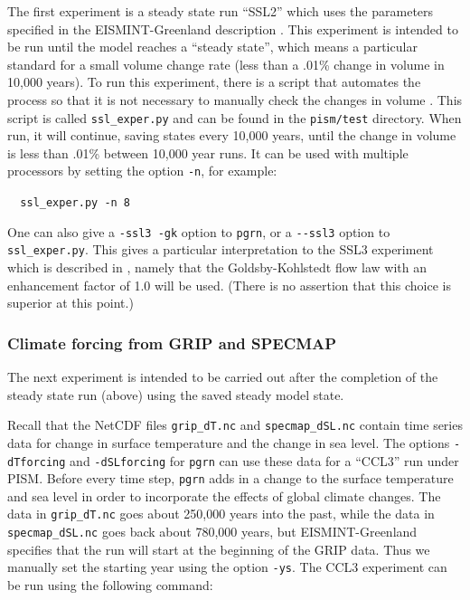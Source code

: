 \documentclass[11pt,final]{amsart}
\begin{document}
The first experiment is a steady state run ``SSL2'' which uses the parameters specified in the EISMINT-Greenland description \cite{RitzEISMINT}. This experiment is intended to be run until the model reaches a ``steady state'', which means a particular standard for a small volume change rate (less than a .01\% change in volume in 10,000 years).  To run this experiment, there is a script that automates the process so that it is not necessary to manually check the changes in volume . This script is called \verb|ssl_exper.py| and can be found in the \verb|pism/test| directory.  When run, it will continue, saving states every 10,000 years, until the change in volume is less than .01\% between 10,000 year runs.  It can be used with multiple processors by setting the option \verb|-n|, for example:

\verb|  ssl_exper.py -n 8|

One can also give a \verb|-ssl3 -gk| option to \verb|pgrn|, or a \verb|--ssl3| option to \verb|ssl_exper.py|.  This gives a particular interpretation to the SSL3 experiment which is described in \cite{RitzEISMINT}, namely that the Goldsby-Kohlstedt flow law \cite{GoldsbyKohlstedt} with an enhancement factor of 1.0 will be used.  (There is no assertion that this choice is superior at this point.)

\subsubsection{Climate forcing from GRIP and SPECMAP}  The next experiment is intended to be carried out after the completion of the steady state run (above) using the saved steady model state. 

Recall that the NetCDF files \verb|grip_dT.nc| and \verb|specmap_dSL.nc| contain time series data for change in surface temperature and the change in sea level.  The options \verb|-dTforcing| and \verb|-dSLforcing| for \verb|pgrn| can use these data for a ``CCL3'' run \cite{RitzEISMINT} under PISM.  Before every time step, \verb|pgrn| adds in a change to the surface temperature and sea level in order to incorporate the effects of global climate changes.  The data in \verb|grip_dT.nc| goes about 250,000 years into the past, while the data in \verb|specmap_dSL.nc| goes back about 780,000 years, but EISMINT-Greenland specifies that the run will start at the beginning of the GRIP data.  Thus we manually set the starting year using the option \verb|-ys|.  The CCL3 experiment can be run using the following command:
\end{document}
